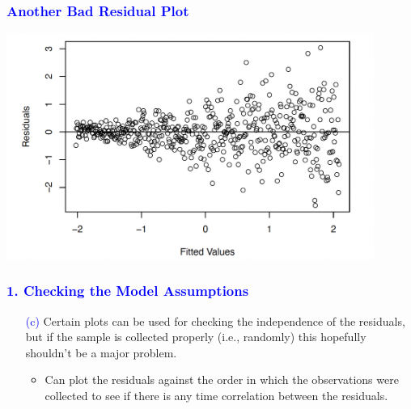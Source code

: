 \documentclass[12pt]{beamer}
\begin{document}
\begin{frame}
	\frametitle{\textcolor{blue}{Another Bad Residual Plot}}
	\centering
	\includegraphics[width=12cm]{abad.png}
\end{frame}
\begin{frame}
	\frametitle{\textcolor{blue}{1. Checking the Model Assumptions}}
	
	\begin{itemize}
		\item[\textcolor{blue}{(c)}] Certain plots can be used for checking the independence of the residuals, but if the sample is collected properly (i.e., randomly) this hopefully shouldn't be a major problem.
		\begin{itemize}[label={\color{blue}$\blacktriangleright$}]
			\item Can plot the residuals against the order in which the observations were collected to see if there is any time correlation between the residuals.
		\end{itemize}
	\end{itemize}
	
\end{frame}
\end{document}
